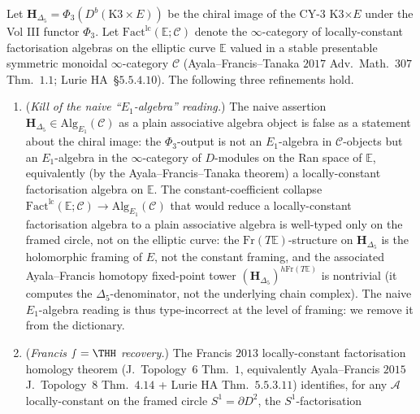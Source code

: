 \begin{proposition}[Lurie--Francis locally-constant factorisation algebra \texorpdfstring{$\mathbf H_{\Delta_5}$}{H-Delta-5}: \texorpdfstring{$E_1$}{E-1}-chiral refinement, Francis \texorpdfstring{$\smallint=\THH$}{smallint=THH} recovery, and BKM Jacobi super-operad]
\label{prop:hochcalc-lurie-francis-locconst-fact-alg-hdelta5-bkm-jacobi}
Let $\mathbf H_{\Delta_5}=\Phi_3(D^b(\mathrm K3\times E))$ be the chiral
image of the CY-$3$ K3$\times E$ under the Vol III functor
$\Phi_3$. Let $\mathrm{Fact}^{\mathrm{lc}}(\mathbb E;\mathcal C)$ denote
the $\infty$-category of locally-constant factorisation algebras on
the elliptic curve $\mathbb E$ valued in a stable presentable symmetric
monoidal $\infty$-category $\mathcal C$ (Ayala--Francis--Tanaka $2017$
Adv.\ Math.\ $307$ Thm.\ $1.1$; Lurie HA~\S$5.5.4.10$). The following
three refinements hold.
\begin{enumerate}[label=(\alph*),leftmargin=1.5em]
 \item (\emph{Kill of the naive ``$E_1$-algebra'' reading.}) The
 naive assertion $\mathbf H_{\Delta_5}\in\mathrm{Alg}_{E_1}(\mathcal C)$
 as a plain associative algebra object is false as a statement about
 the chiral image: the $\Phi_3$-output is not an $E_1$-algebra in
 $\mathcal C$-objects but an $E_1$-algebra in the $\infty$-category of
 $D$-modules on the Ran space of $\mathbb E$, equivalently (by the
 Ayala--Francis--Tanaka theorem) a locally-constant factorisation
 algebra on $\mathbb E$. The constant-coefficient collapse
 $\mathrm{Fact}^{\mathrm{lc}}(\mathbb E;\mathcal C)
 \to\mathrm{Alg}_{E_1}(\mathcal C)$ that would reduce a locally-constant
 factorisation algebra to a plain associative algebra is well-typed
 only on the framed circle, not on the elliptic curve: the
 $\mathrm{Fr}(T\mathbb E)$-structure on $\mathbf H_{\Delta_5}$ is the
 holomorphic framing of $E$, not the constant framing, and the
 associated Ayala--Francis homotopy fixed-point tower
 $(\mathbf H_{\Delta_5})^{h\mathrm{Fr}(T\mathbb E)}$ is nontrivial (it
 computes the $\Delta_5$-denominator, not the underlying chain
 complex). The naive $E_1$-algebra reading is thus type-incorrect at
 the level of framing: we remove it from the dictionary.
 \item (\emph{Francis $\smallint=\THH$ recovery.}) The Francis $2013$
 locally-constant factorisation homology theorem
 (J.\ Topology~$6$ Thm.\ $1$, equivalently
 Ayala--Francis $2015$ J.\ Topology~$8$ Thm.\ $4.14$ + Lurie HA
 Thm.\ $5.5.3.11$) identifies, for any $\mathcal A$ locally-constant
 on the framed circle $S^1=\partial D^2$, the $S^1$-factorisation

\end{enumerate}
\end{proposition}
